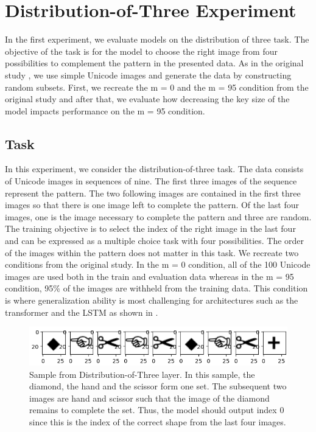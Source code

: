 \section{Distribution-of-Three Experiment}
In the first experiment, we evaluate models on the distribution of three task. The objective of the task is for the model to choose the right image from four possibilities to complement the pattern in the presented data. As in the original study \textcite{webb_emergent_2021}, we use simple Unicode images and generate the data by constructing random subsets. First, we recreate the m = 0 and the m = 95 condition from the original study and after that, we evaluate how decreasing the key size of the model impacts performance on the m = 95 condition.

\subsection{Task}
In this experiment, we consider the distribution-of-three task. The data consists of Unicode images in sequences of nine. The first three images of the sequence represent the pattern. The two following images are contained in the first three images so that there is one image left to complete the pattern. Of the last four images, one is the image necessary to complete the pattern and three are random. The training objective is to select the index of the right image in the last four and can be expressed as a multiple choice task with four possibilities. The order of the images within the pattern does not matter in this task. \newline
We recreate two conditions from the original study. In the m = 0 condition, all of the 100 Unicode images are used both in the train and evaluation data whereas in the m = 95 condition, 95\% of the images are withheld from the training data. This condition is where generalization ability is most challenging for architectures such as the transformer \textcite{vaswani_attention_2023} and the LSTM \textcite{hochreiter_long_1997} as shown in \textcite{webb_emergent_2021}.

\begin{figure}
    \centering
    \includegraphics[width=0.8\linewidth]{images/sample_data.png}
    \caption{Sample from Distribution-of-Three layer. In this sample, the diamond, the hand and the scissor form one set. The subsequent two images are hand and scissor such that the image of the diamond remains to complete the set. Thus, the model should output index 0 since this is the index of the correct shape from the last four images.}
    \label{fig:sample_data}
\end{figure}

